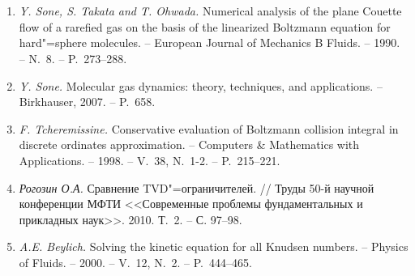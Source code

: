 \documentclass[english,russian,a4paper,12pt]{article}
\begin{document}
\section*{}

\begin{enumerate}
	\item \textit{Y. Sone, S. Takata and T. Ohwada.}
	Numerical analysis of the plane Couette flow of a rarefied gas on the basis of the linearized Boltzmann equation
	for hard"=sphere molecules. -- European Journal of Mechanics B Fluids. -- 1990. -- N.~8. -- P.~273--288.\label{bib:dXXX-1}
	\item \textit{Y. Sone.}
	Molecular gas dynamics: theory, techniques, and applications. -- Birkhauser, 2007. -- P.~658. \label{bib:dXXX-2}
	\item \textit{F. Tcheremissine.}
	Conservative evaluation of Boltzmann collision integral in discrete ordinates approximation. --
	Computers \& Mathematics with Applications. -- 1998. -- V.~38, N.~1-2. -- P.~215--221. \label{bib:dXXX-3}
	\item \textit{Рогозин О.А.} Сравнение TVD"=ограничителей.
	// Труды 50-й научной конференции МФТИ <<Современные проблемы фундаментальных и прикладных наук>>.
	2010. Т.~2. -- С. 97--98. \label{bib:dXXX-4}
	\item \textit{A.E. Beylich.}
	Solving the kinetic equation for all Knudsen numbers. --
	Physics of Fluids. -- 2000. -- V.~12, N.~2. -- P.~444--465. \label{bib:dXXX-5}
	
\end{enumerate}
\end{document}
